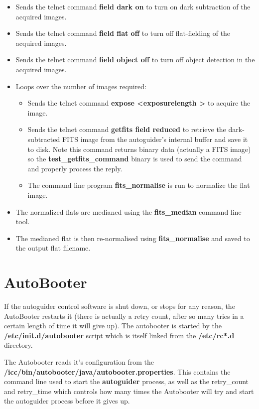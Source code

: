 \documentclass[10pt,a4paper]{article}
\begin{document}
\begin{itemize}
\item Sends the telnet command {\bf field dark on} to turn on dark subtraction of the acquired images.
\item Sends the telnet command {\bf field flat off} to turn off flat-fielding of the acquired images.
\item Sends the telnet command {\bf field object off} to turn off object detection in the acquired images.
\item Loops over the number of images required:
         \begin{itemize}
         \item Sends the telnet command {\bf expose \textless exposurelength \textgreater} to acquire the image.
	 \item Sends the telnet command {\bf getfits field reduced} to retrieve the dark-subtracted FITS image from the autoguider's internal buffer and save it to disk. Note this command returns binary data (actually a FITS image) so the {\bf test\_getfits\_command} binary is used to send the command and properly process the reply.
	 \item The command line program {\bf fits\_normalise} is run to normalize the flat image.
	 \end{itemize}
\item The normalized flats are medianed using the {\bf fits\_median} command line tool.
\item The medianed flat is then re-normalised using  {\bf fits\_normalise} and saved to the output flat filename.
\end{itemize}

\section{AutoBooter}
\label{sec:Autobooter}

If the autoguider control software is shut down, or stops for any reason, the AutoBooter restarts it (there is actually a retry count, after so many tries in a certain length of time it will give up). The autobooter is started by the {\bf /etc/init.d/autobooter} script which is itself linked from the {\bf /etc/rc*.d} directory.

The Autobooter reads it's configuration from the {\bf /icc/bin/autobooter/java/autobooter.properties}. This contains
the command line used to start the {\bf autoguider} process, as well as the retry\_count and retry\_time which controls how many times the Autobooter will try and start the autoguider process before it gives up.
\end{document}
